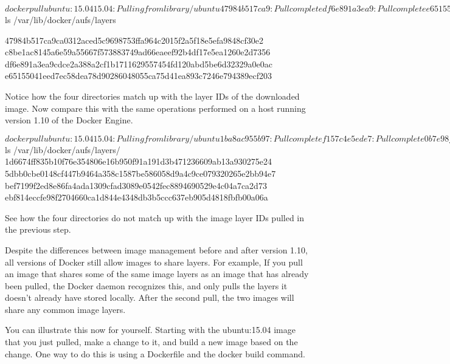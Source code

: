 $  docker pull ubuntu:15.04

15.04: Pulling from library/ubuntu
47984b517ca9: Pull complete
df6e891a3ea9: Pull complete
e65155041eed: Pull complete
c8be1ac8145a: Pull complete
Digest: sha256:5e279a9df07990286cce22e1b0f5b0490629ca6d187698746ae5e28e604a640e
Status: Downloaded newer image for ubuntu:15.04

$ ls /var/lib/docker/aufs/layers

47984b517ca9ca0312aced5c9698753ffa964c2015f2a5f18e5efa9848cf30e2
c8be1ac8145a6e59a55667f573883749ad66eaeef92b4df17e5ea1260e2d7356
df6e891a3ea9cdce2a388a2cf1b1711629557454fd120abd5be6d32329a0e0ac
e65155041eed7ec58dea78d90286048055ca75d41ea893c7246e794389ecf203

Notice how the four directories match up with the layer IDs of the downloaded image. Now compare this with the same operations performed on a host running version 1.10 of the Docker Engine.

$ docker pull ubuntu:15.04
15.04: Pulling from library/ubuntu
1ba8ac955b97: Pull complete
f157c4e5ede7: Pull complete
0b7e98f84c4c: Pull complete
a3ed95caeb02: Pull complete
Digest: sha256:5e279a9df07990286cce22e1b0f5b0490629ca6d187698746ae5e28e604a640e
Status: Downloaded newer image for ubuntu:15.04

$ ls /var/lib/docker/aufs/layers/
1d6674ff835b10f76e354806e16b950f91a191d3b471236609ab13a930275e24
5dbb0cbe0148cf447b9464a358c1587be586058d9a4c9ce079320265e2bb94e7
bef7199f2ed8e86fa4ada1309cfad3089e0542fec8894690529e4c04a7ca2d73
ebf814eccfe98f2704660ca1d844e4348db3b5ccc637eb905d4818fbfb00a06a

See how the four directories do not match up with the image layer IDs pulled in the previous step.

Despite the differences between image management before and after version 1.10, all versions of Docker still allow images to share layers. For example, If you pull an image that shares some of the same image layers as an image that has already been pulled, the Docker daemon recognizes this, and only pulls the layers it doesn’t already have stored locally. After the second pull, the two images will share any common image layers.

You can illustrate this now for yourself. Starting with the ubuntu:15.04 image that you just pulled, make a change to it, and build a new image based on the change. One way to do this is using a Dockerfile and the docker build command.





